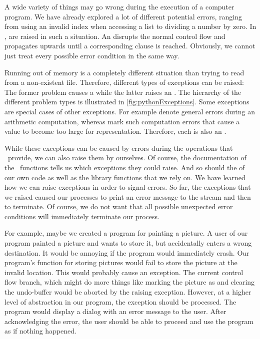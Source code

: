 %
A wide variety of things may go wrong during the execution of a computer program.
We have already explored a lot of different potential errors, ranging from using an invalid index when accessing a list to dividing a number by zero.
In \python,  are raised in such a situation.
An  disrupts the normal control flow and propagates upwards until a corresponding  clause is reached.
Obviously, we cannot just treat every possible error condition in the same way.

Running out of memory is a completely different situation than trying to read from a non-existent file.
Therefore, different types of exceptions can be raised:
The former problem causes a  while the latter raises an .
The hierarchy of the different problem types is illustrated in \cref{fig:pythonExceptions}.
Some exceptions are special cases of other exceptions.
For example  denote general errors during an arithmetic computation, whereas  mark such computation errors that cause a value to become too large for representation.
Therefore, each  is also an .

While these exceptions can be caused by errors during the operations that \python\ provide, we can also raise them by ourselves.
Of course, the documentation of the \python\ functions tells us which exceptions they could raise.
And so should the  of our own code as well as the library functions that we rely on.%
\FloatBarrier%
\endhsection%
%
%
%
We have learned how we can raise exceptions in order to signal errors.
So far, the exceptions that we raised caused our processes to print an error message to the  stream and then to terminate.
Of course, we do not want that all possible unexpected error conditions will immediately terminate our process.

For example, maybe we created a program for painting a picture.
A user of our program painted a picture and wants to store it, but accidentally enters a wrong destination.
It would be annoying if the program would immediately crash.
Our program's function for storing pictures would fail to store the picture at the invalid location.
This would probably cause an exception.
The current control flow branch, which might do more things like marking the picture as  and clearing the undo-buffer would be aborted by the raising exception.
However, at a higher level of abstraction in our program, the exception should be processed.
The program would display a dialog with an error message to the user.
After acknowledging the error, the user should be able to proceed and use the program as if nothing happened.

